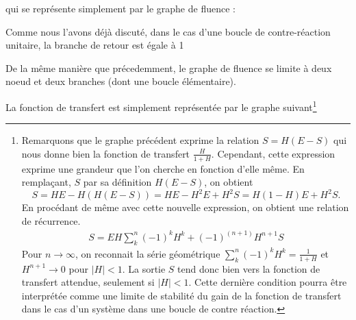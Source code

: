qui se représente simplement par le graphe de fluence :
\begin{center}
\end{center}
Comme nous l'avons déjà discuté, dans le cas d'une boucle 
de contre-réaction unitaire, la branche de retour est égale à 1
\begin{center}
\end{center}
De la même manière que précedemment, le graphe de fluence se limite à deux noeud 
et deux branches (dont une boucle élémentaire).
\begin{center}
\end{center}
La fonction de transfert est simplement représentée par le graphe suivant\footnote{Remarquons 
que le graphe précédent exprime la relation $S=H(E-S)$ qui nous donne bien la fonction de 
transfert $\frac{H}{1+H}$. Cependant, cette expression exprime une grandeur que l'on 
cherche en fonction d'elle même. En remplaçant, $S$ par sa définition $H(E-S)$, on obtient
$$S=HE-H(H(E-S))=HE-H^2E+H^2S=H(1-H)E+H^2S.$$ En procédant de même avec cette nouvelle expression, 
on obtient une relation de récurrence. 
\begin{align*}
    S=EH\sum_k^n (-1)^kH^k+(-1)^{(n+1)}H^{n+1}S
\end{align*}
Pour $n\rightarrow\infty$, on reconnait la série géométrique $\sum_k^n(-1)^kH^k=\frac{1}{1+H}$ 
et $H^{n+1}\rightarrow 0$ pour $|H|<1$.
La sortie $S$ tend donc bien vers la fonction de transfert attendue, seulement si $|H|<1$. 
Cette dernière condition pourra être interprétée comme une limite de stabilité du gain 
de la fonction de transfert dans le cas d'un système dans une boucle de contre réaction.}
\begin{center}
\end{center}

